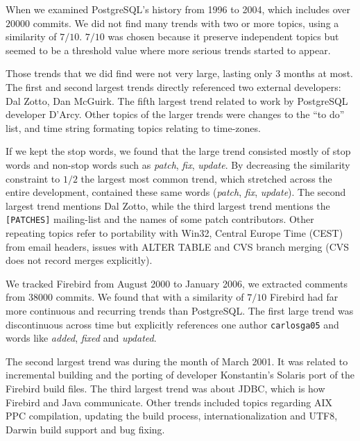 \documentclass[times, 10pt,twocolumn]{article}
\newcommand{\shrinkit}{\vspace*{-.3em}}
\begin{document}
\shrinkit
{}
\shrinkit


When we examined PostgreSQL's history from 1996 to 2004, which includes
over $20 000$ commits. We did not find many trends with two or more
topics, using a similarity of $7/10$. $7/10$ was chosen because it
preserve independent topics but seemed to be a threshold
value where more serious trends started to appear.

Those trends that we did find
were not very large, lasting only 3 months at most. The first and second
largest trends directly referenced two external developers:
Dal Zotto, Dan McGuirk. The fifth largest trend related to work by
PostgreSQL developer D'Arcy. Other topics of the larger trends were
changes to the ``to do'' list, and time string formating topics
relating to time-zones.

If we kept the stop words, we found that the large trend consisted
mostly of stop words and non-stop words such as \emph{patch},
\emph{fix}, \emph{update}.  By decreasing the similarity constraint to
$1/2$ the largest most common trend, which stretched across
the entire development, contained these same words (\emph{patch},
\emph{fix}, \emph{update}). The second largest trend mentions Dal
Zotto, while the third largest trend mentions the \texttt{[PATCHES]}
mailing-list and the names of some patch contributors.  Other repeating
topics refer to portability with Win32, Central Europe Time (CEST)
from email headers, issues with ALTER TABLE and CVS branch merging
(CVS does not record merges explicitly).


\shrinkit
{}
\shrinkit



We tracked Firebird from August 2000 to January 2006, we extracted comments from $38 000$ commits. We found that with a
similarity of $7/10$ Firebird had far more continuous and
recurring trends than PostgreSQL.  The first large trend was discontinuous
across time but explicitly references one author \texttt{carlosga05}
and words like \emph{added}, \emph{fixed} and \emph{updated}.

The second largest trend was during the month of March 2001. It was
related to incremental building and the porting of developer
Konstantin's Solaris port of the Firebird build files. The third
largest trend was about JDBC, which is how Firebird and Java
communicate.  Other trends included topics regarding AIX PPC
compilation, updating the build process, internationalization and
UTF8, Darwin build support and bug fixing.
\end{document}
